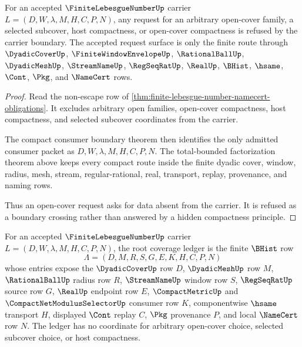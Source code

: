 \begin{theorem}
\label{thm:finite-lebesgue-number-open-cover-refusal-boundary}
For an accepted $\FiniteLebesgueNumberUp$ carrier $L=(D,W,\lambda,M,H,C,P,N)$, any request for an arbitrary open-cover family, a selected subcover, host compactness, or open-cover compactness is refused by the carrier boundary. The accepted request surface is only the finite route through $\DyadicCoverUp$, $\FiniteWindowEnvelopeUp$, $\RationalBallUp$, $\DyadicMeshUp$, $\StreamNameUp$, $\RegSeqRatUp$, $\RealUp$, $\BHist$, $\hsame$, $\Cont$, $\Pkg$, and $\NameCert$ rows.
\end{theorem}
\begin{proof}
Read the non-escape row of \autoref{thm:finite-lebesgue-number-namecert-obligations}. It excludes arbitrary open families, open-cover compactness, host compactness, and selected subcover coordinates from the carrier.

The compact consumer boundary theorem then identifies the only admitted consumer packet as $D,W,\lambda,M,H,C,P,N$. The total-bounded factorization theorem above keeps every compact route inside the finite dyadic cover, window, radius, mesh, stream, regular-rational, real, transport, replay, provenance, and naming rows.

Thus an open-cover request asks for data absent from the carrier. It is refused as a boundary crossing rather than answered by a hidden compactness principle.
\end{proof}

\begin{definition}
\label{def:finite-lebesgue-number-root-coverage-ledger}
For an accepted $\FiniteLebesgueNumberUp$ carrier $L=(D,W,\lambda,M,H,C,P,N)$, the root coverage ledger is the finite $\BHist$ row
$$
\Lambda=(D,M,R,S,G,E,K,H,C,P,N)
$$
whose entries expose the $\DyadicCoverUp$ row $D$, $\DyadicMeshUp$ row $M$, $\RationalBallUp$ radius row $R$, $\StreamNameUp$ window row $S$, $\RegSeqRatUp$ source row $G$, $\RealUp$ endpoint row $E$, $\CompactMetricUp$ and $\CompactNetModulusSelectorUp$ consumer row $K$, componentwise $\hsame$ transport $H$, displayed $\Cont$ replay $C$, $\Pkg$ provenance $P$, and local $\NameCert$ row $N$. The ledger has no coordinate for arbitrary open-cover choice, selected subcover choice, or host compactness.
\end{definition}

